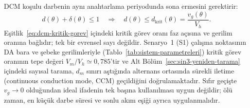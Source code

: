 DCM koşulu darbenin aynı anahtarlama periyodunda sona ermesini gerektirir:
\begin{equation}
  d(\theta)+\delta(\theta)\leq 1
  \quad\Longrightarrow\quad
  d(\theta)\leq d_{\mathrm{krit}}(\theta)=\frac{v_g(\theta)}{V_h}.
  \label{eq:dcm-kritik-gorev}
\end{equation}
Eşitlik~\eqref{eq:dcm-kritik-gorev} içindeki kritik görev oranı faz açısına ve gerilim oranına bağlıdır; tek bir evrensel sayı değildir. Senaryo~1 (S1) çalışma noktasının DA bara ve şebeke gerilimleriyle (Tablo~\ref{tab:sistem-parametreleri}) kritik görev oranının tepe değeri $V_m/V_h\simeq0{,}785$'tir ve Alt Bölüm~\ref{sec:sin3-yeniden-tarama} içindeki sayısal tarama, $d_m$ sınırı aştığında alternans ortasında sürekli iletime (continuous conduction mode, CCM) geçildiğini doğrulamaktadır. Sıfır geçişte $v_g\rightarrow0$ olduğundan ideal ifadenin tek başına kullanılması uygun değildir; ölü zaman, en küçük darbe süresi ve sonlu akım eşiği ayrıca uygulanmalıdır.

